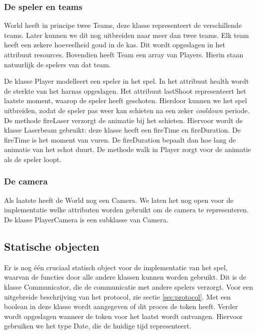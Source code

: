 \documentclass[a4paper,11pt]{article}
\newcommand{\protoref}{sectie \ref{sec:protocol}}
\begin{document}
\subsubsection{De speler en teams}
World heeft in principe twee Teams, deze klasse representeert de verschillende teams. Later kunnen we dit nog uitbreiden naar meer dan twee teams. Elk team heeft een zekere hoeveelheid goud in de kas. Dit wordt opgeslagen in het attribuut resources. Bovendien heeft Team een array van Players. Hierin staan natuurlijk de spelers van dat team.

De klasse Player modelleert een speler in het spel. In het attribuut health wordt de sterkte van het harnas opgeslagen. Het attribuut lastShoot representeert het laatste moment, waarop de speler heeft geschoten. Hierdoor kunnen we het spel uitbreiden, zodat de speler pas weer kan schieten na een zeker \emph{cooldown} periode. De methode fireLaser verzorgt de animatie bij het schieten. Hiervoor wordt de klasse Laserbeam gebruikt: deze klasse heeft een fireTime en fireDuration. De fireTime is het moment van vuren. De fireDuration bepaalt dan hoe lang de animatie van het schot duurt. De methode walk in Player zorgt voor de animatie als de speler loopt.

\subsubsection{De camera}
Als laatste heeft de World nog een Camera. We laten het nog open voor de implementatie welke attributen worden gebruikt om de camera te representeren. De klasse PlayerCamera is een subklasse van Camera.

\subsection{Statische objecten}
Er is nog \'e\'en cruciaal statisch object voor de implementatie van het spel, waarvan de functies door alle andere klassen kunnen worden gebruikt. Dit is de klasse Communicator, die de communicatie met andere spelers verzorgt.  Voor een uitgebreide beschrijving van het protocol, zie \protoref. Met een boolean in deze klasse wordt aangegeven of dit proces de token heeft. Verder wordt opgeslagen wanneer de token voor het laatst wordt ontvangen. Hiervoor gebruiken we het type Date, die de huidige tijd representeert.
\end{document}
